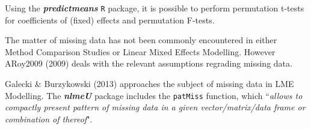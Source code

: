 Using the \textbf{\textit{predictmeans}} \texttt{R} package, it is possible to perform permutation t-tests for coefficients of (fixed) effects and permutation F-tests.

The matter of missing data has not been commonly encountered in either Method Comparison Studies or Linear Mixed Effects Modelling. However ARoy2009 (2009) deals with the relevant assumptions regrading missing data. 

Galecki \& Burzykowski (2013) approaches the subject of missing data in LME Modelling. The \textbf{\textit{nlmeU}} package includes the \texttt{patMiss} function, which ``\textit{allows to compactly present pattern of missing data in a given vector/matrix/data
	frame or combination of thereof}".

